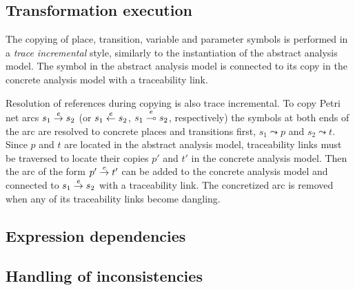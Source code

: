 \subsection{Transformation execution}

The copying of place, transition, variable and parameter symbols is performed in a \emph{trace incremental} style, similarly to the instantiation of the abstract analysis model. The symbol in the abstract analysis model is connected to its copy in the concrete analysis model with a traceability link.

Resolution of references during copying is also trace incremental. To copy Petri net arcs \(s_1 \overset{e}{\rightarrow} s_2\) (or \(s_1 \overset{e}{\leftarrow} s_2\), \(s_1 \overset{e}{\multimap} s_2\), respectively) the symbols at both ends of the arc are resolved to concrete places and transitions first, \(s_1 \leadsto p\) and \(s_2 \leadsto t\). Since \(p\) and \(t\) are located in the abstract analysis model, traceability links must be traversed to locate their copies \(p'\) and \(t'\) in the concrete analysis model. Then the arc of the form \(p' \overset{e}{\rightarrow} t'\) can be added to the concrete analysis model and connected to \(s_1 \overset{e}{\rightarrow} s_2\) with a traceability link. The concretized arc is removed when any of its traceability links become dangling. 

\subsection{Expression dependencies}

\subsection{Handling of inconsistencies}